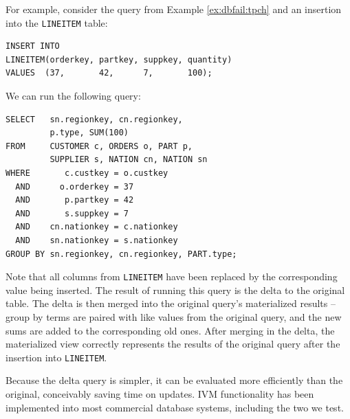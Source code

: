 \begin{example}
For example, consider the query from Example \ref{ex:dbfail:tpch} and an insertion into the {\tt LINEITEM} table:
\begin{verbatim}
INSERT INTO 
LINEITEM(orderkey, partkey, suppkey, quantity)
VALUES  (37,       42,      7,       100);
\end{verbatim}

We can run the following query:
\begin{verbatim}
SELECT   sn.regionkey, cn.regionkey,
         p.type, SUM(100)
FROM     CUSTOMER c, ORDERS o, PART p, 
         SUPPLIER s, NATION cn, NATION sn
WHERE       c.custkey = o.custkey
  AND      o.orderkey = 37
  AND       p.partkey = 42
  AND       s.suppkey = 7
  AND    cn.nationkey = c.nationkey
  AND    sn.nationkey = s.nationkey
GROUP BY sn.regionkey, cn.regionkey, PART.type;
\end{verbatim}

Note that all columns from {\tt LINEITEM} have been replaced by the corresponding value being inserted.  The result of running this query is the delta to the original table.  The delta is then merged into the original query's materialized results -- group by terms are paired with like values from the original query, and the new sums are added to the corresponding old ones.  After merging in the delta, the materialized view correctly represents the results of the original query after the insertion into {\tt LINEITEM}.
\end{example}

Because the delta query is simpler, it can be evaluated more efficiently than the original, conceivably saving time on updates.  IVM functionality has been implemented into most commercial database systems, including the two we test.

